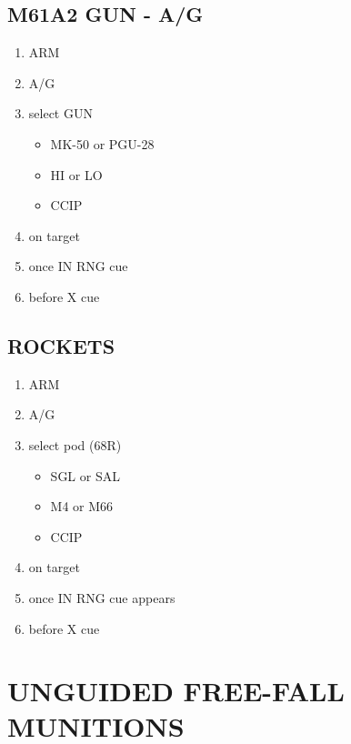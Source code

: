 \documentclass[fontInter, widesubsec]{TechCheck}
\begin{document}
	\subsection{M61A2 GUN - A/G}
	\begin{enumerate}
		\item {}\dotfill ARM
		\item {}\dotfill A/G
		\item {}\dotfill select GUN
		\begin{itemize}
			\item {} MK-50 or PGU-28
			\item {} HI or LO
			\item {} CCIP
		\end{itemize}
		\item {}\dotfill on target
		\item {}\dotfill once IN RNG cue
		\item {}\dotfill before X cue
	\end{enumerate}

	\subsection{ROCKETS}
	\begin{enumerate}
		\item {}\dotfill ARM
		\item {}\dotfill A/G
		\item {}\dotfill select pod (68R)
		\begin{itemize}
			\item {} SGL or SAL
			\item {} M4 or M66
			\item {} CCIP
		\end{itemize}
		\item {}\dotfill on target
		\item {}\dotfill once IN RNG cue appears
		\item {}\dotfill before X cue
	\end{enumerate}

	\section{UNGUIDED FREE-FALL MUNITIONS}
\end{document}
